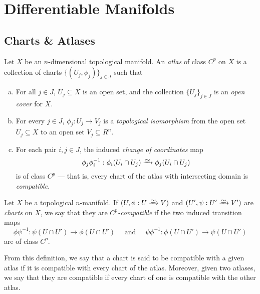 \section{Differentiable Manifolds}

\subsection{Charts \& Atlases}

\begin{definition}[Atlas]
    \label{def:Cp-atlas}
    Let \(X\) be an \(n\)-dimensional topological manifold. An \emph{atlas} of class
    \(C^p\) on \(X\) is a collection of charts \(\{(U_j, \phi_j)\}_{j \in J}\) such
    that
    \begin{enumerate}[(a)]\setlength\itemsep{0em}
        \item For all \(j \in J\), \(U_j \subseteq X\) is an open set, and
              the collection \(\{U_j\}_{j \in J}\) is an \emph{open cover} for \(X\).

        \item For every \(j \in J\), \(\phi_j: U_j \to V_j\) is a \emph{topological
                  isomorphism} from the open set \(U_j \subseteq X\) to an open set \(V_j
              \subseteq R^n\).

        \item For each pair \(i, j \in J\), the induced \emph{change of coordinates} map
              \[
                  \phi_j \phi_i^{-1}: \phi_i(U_i \cap U_j) \isoto \phi_j(U_i \cap U_j)
              \]
              is of class \(C^p\) --- that is, every chart of the atlas with intersecting
              domain is \emph{compatible}.
    \end{enumerate}
\end{definition}

\begin{definition}
    \label{def:compatible-chart}
    Let \(X\) be a topological \(n\)-manifold. If \((U, \phi: U \isoto V)\) and
    \((U', \psi: U' \isoto V')\) are \emph{charts} on \(X\), we say that they are
    \emph{\(C^p\)-compatible} if the two induced transition maps
    \[
        \phi \psi^{-1}: \psi(U \cap U') \longrightarrow \phi(U \cap U')
        \quad\text{ and }\quad
        \psi \phi^{-1}: \phi(U \cap U') \longrightarrow \psi(U \cap U')
    \]
    are of class \(C^p\).

    From this definition, we say that a chart is said to be compatible with a given
    atlas if it is compatible with every chart of the atlas.  Moreover, given two
    atlases, we say that they are compatible if every chart of one is compatible
    with the other atlas.
\end{definition}

